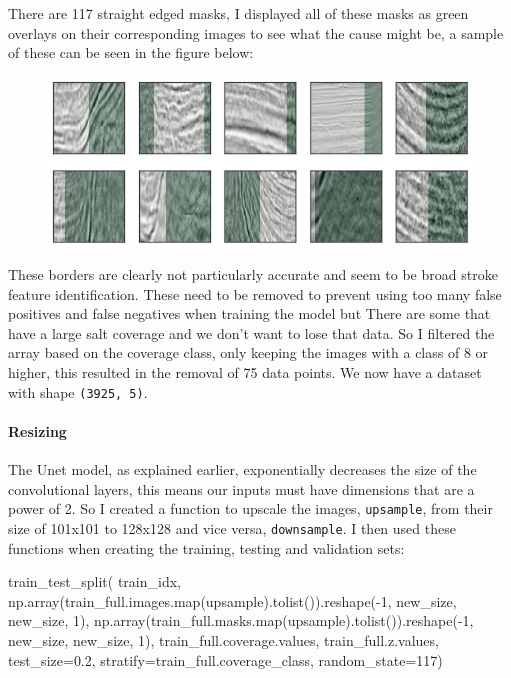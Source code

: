 \documentclass[11pt]{article}
\makeatletter
\def\maxwidth{\ifdim\Gin@nat@width>\linewidth\linewidth
    \else\Gin@nat@width\fi}
\let\Oldincludegraphics\includegraphics
\renewcommand{\includegraphics}[1]{\Oldincludegraphics[width=.8\maxwidth]{#1}}
\newenvironment{Shaded}{}{}
\newcommand{\DecValTok}[1]{\textcolor[rgb]{0.25,0.63,0.44}{{#1}}}
\newcommand{\FloatTok}[1]{\textcolor[rgb]{0.25,0.63,0.44}{{#1}}}
\newcommand{\NormalTok}[1]{{#1}}
\newcommand{\OperatorTok}[1]{\textcolor[rgb]{0.40,0.40,0.40}{{#1}}}
\newcommand{\BuiltInTok}[1]{{#1}}
\makeatother
\begin{document}
There are 117 straight edged masks, I displayed all of these masks as
green overlays on their corresponding images to see what the cause might
be, a sample of these can be seen in the figure below:

\begin{figure}
\centering
\includegraphics{pictures/straight.png}
\caption{}
\end{figure}

These borders are clearly not particularly accurate and seem to be broad
stroke feature identification. These need to be removed to prevent using
too many false positives and false negatives when training the model but
There are some that have a large salt coverage and we don't want to lose
that data. So I filtered the array based on the coverage class, only
keeping the images with a class of 8 or higher, this resulted in the
removal of 75 data points. We now have a dataset with shape
\texttt{(3925,\ 5)}.

\paragraph{Resizing}\label{resizing}

The Unet model, as explained earlier, exponentially decreases the size
of the convolutional layers, this means our inputs must have dimensions
that are a power of 2. So I created a function to upscale the images,
\texttt{upsample}, from their size of 101x101 to 128x128 and vice versa,
\texttt{downsample}. I then used these functions when creating the
training, testing and validation sets:

\begin{Shaded}
\begin{Highlighting}[]
\NormalTok{train_test_split(}
\NormalTok{    train_idx,}
\NormalTok{    np.array(train_full.images.}\BuiltInTok{map}\NormalTok{(upsample).tolist()).reshape(}\OperatorTok{-}\DecValTok{1}\NormalTok{, new_size, new_size, }\DecValTok{1}\NormalTok{),}
\NormalTok{    np.array(train_full.masks.}\BuiltInTok{map}\NormalTok{(upsample).tolist()).reshape(}\OperatorTok{-}\DecValTok{1}\NormalTok{, new_size, new_size, }\DecValTok{1}\NormalTok{),}
\NormalTok{    train_full.coverage.values,}
\NormalTok{    train_full.z.values,}
\NormalTok{    test_size}\OperatorTok{=}\FloatTok{0.2}\NormalTok{, stratify}\OperatorTok{=}\NormalTok{train_full.coverage_class, random_state}\OperatorTok{=}\DecValTok{117}\NormalTok{)}
\end{Highlighting}
\end{Shaded}
\end{document}
